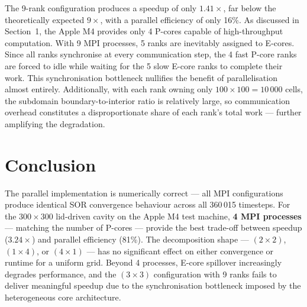 \documentclass[11pt, a4paper]{article}
\begin{document}
The 9-rank configuration produces a speedup of only $1.41\times$, far below the
theoretically expected $9\times$, with a parallel efficiency of only 16\%. As
discussed in Section~1, the Apple M4 provides only 4 P-cores capable of
high-throughput computation. With 9 MPI processes, 5 ranks are inevitably
assigned to E-cores. Since all ranks synchronise at every communication step, the
4 fast P-core ranks are forced to idle while waiting for the 5 slow E-core ranks
to complete their work. This synchronisation bottleneck nullifies the benefit of
parallelisation almost entirely. Additionally, with each rank owning only
$100\times100 = 10\,000$ cells, the subdomain boundary-to-interior ratio is
relatively large, so communication overhead constitutes a disproportionate share
of each rank's total work --- further amplifying the degradation.

\section{Conclusion}

The parallel implementation is numerically correct --- all MPI configurations
produce identical SOR convergence behaviour across all 360\,015 timesteps. For
the $300\times300$ lid-driven cavity on the Apple M4 test machine, \textbf{4 MPI
processes} --- matching the number of P-cores --- provide the best trade-off
between speedup ($3.24\times$) and parallel efficiency (81\%). The decomposition
shape --- $(2\times2)$, $(1\times4)$, or $(4\times1)$ --- has no significant
effect on either convergence or runtime for a uniform grid. Beyond 4 processes,
E-core spillover increasingly degrades performance, and the $(3\times3)$
configuration with 9 ranks fails to deliver meaningful speedup due to the
synchronisation bottleneck imposed by the heterogeneous core architecture.
\end{document}

